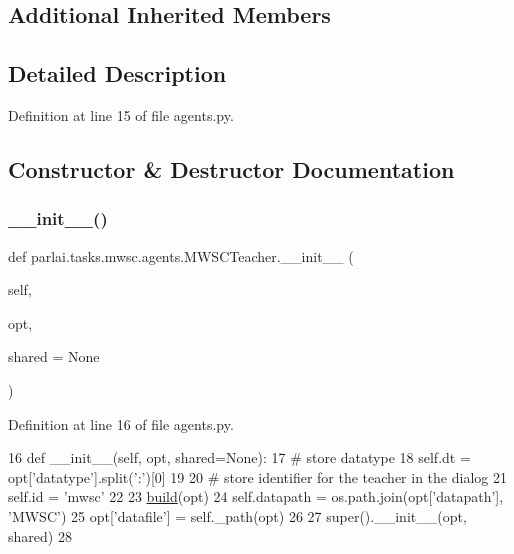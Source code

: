 \subsection*{Additional Inherited Members}


\subsection{Detailed Description}


Definition at line 15 of file agents.\+py.



\subsection{Constructor \& Destructor Documentation}
\mbox{\label{classparlai_1_1tasks_1_1mwsc_1_1agents_1_1MWSCTeacher_a320ae602bd8670b70b4077d406c04e79}} 
\subsubsection{\texorpdfstring{\+\_\+\+\_\+init\+\_\+\+\_\+()}{\_\_init\_\_()}}
{\footnotesize\ttfamily def parlai.\+tasks.\+mwsc.\+agents.\+M\+W\+S\+C\+Teacher.\+\_\+\+\_\+init\+\_\+\+\_\+ (\begin{DoxyParamCaption}\item[{}]{self,  }\item[{}]{opt,  }\item[{}]{shared = {\ttfamily None} }\end{DoxyParamCaption})}



Definition at line 16 of file agents.\+py.


\begin{DoxyCode}
16     \textcolor{keyword}{def }\_\_init\_\_(self, opt, shared=None):
17         \textcolor{comment}{# store datatype}
18         self.dt = opt[\textcolor{stringliteral}{'datatype'}].split(\textcolor{stringliteral}{':'})[0]
19 
20         \textcolor{comment}{# store identifier for the teacher in the dialog}
21         self.id = \textcolor{stringliteral}{'mwsc'}
22 
23         \hyperlink{namespaceparlai_1_1mturk_1_1tasks_1_1talkthewalk_1_1download_a8c0fbb9b6dfe127cb8c1bd6e7c4e33fd}{build}(opt)
24         self.datapath = os.path.join(opt[\textcolor{stringliteral}{'datapath'}], \textcolor{stringliteral}{'MWSC'})
25         opt[\textcolor{stringliteral}{'datafile'}] = self.\_path(opt)
26 
27         super().\_\_init\_\_(opt, shared)
28 
\end{DoxyCode}


